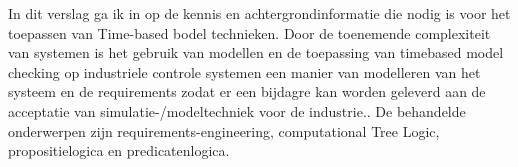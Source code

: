 \documentclass{article}
\begin{document}
	In dit verslag ga ik in op de kennis en achtergrondinformatie die nodig is voor het toepassen van Time-based bodel technieken. 
	Door de toenemende complexiteit van systemen is het gebruik van modellen en de toepassing van timebased model checking  op industriele controle systemen een manier van modelleren van het systeem en de requirements zodat er een bijdagre kan worden geleverd aan de acceptatie van  simulatie-/modeltechniek voor de industrie.\cite{RijnensupervisorsynthesisLock}. 
	De behandelde onderwerpen zijn requirements-engineering, computational Tree Logic, propositielogica en predicatenlogica.
\end{document}
